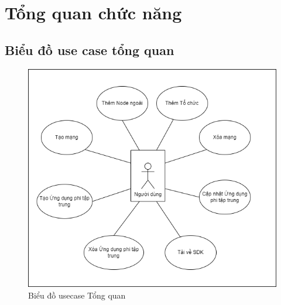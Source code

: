 \documentclass[../DoAn.tex]{subfiles}
\begin{document}



\section{Tổng quan chức năng}
\label{section:2.2}

\subsection{Biểu đồ use case tổng quan}
\label{subsection:2.2.1}

\begin{figure}[h]
  \centering
  \includegraphics[width=0.7\linewidth]{Hinhve/DoAn-usecase.drawio.png}
  \caption[Biểu đồ usecase Tổng quan]{Biểu đồ usecase Tổng quan}
  \label{fig:general_usecase}
\end{figure}
\end{document}
